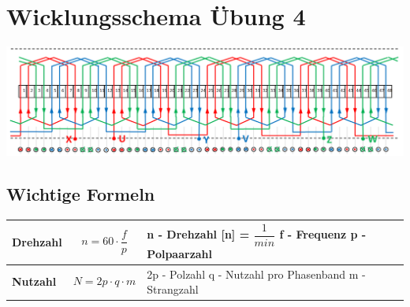 \section{Wicklungsschema Übung 4}
\includegraphics[scale = 0.5]{images/Wicklungsschema}
\subsection{Wichtige Formeln}
    \renewcommand{\arraystretch}{1}
\begin{tabular}{|C{0.3\textwidth}|P{0.3\textwidth}|P{0.3\textwidth}|}
	\hline
	\textbf{Drehzahl} &
    \[n = 60\cdot \dfrac{f}{p}\] &
    \vspace{0.1cm}n - Drehzahl [n] = $\dfrac{1}{min}$ \newline 
    f - Frequenz \newline
    p - Polpaarzahl 
    \\ \hline
	\textbf{Nutzahl} &
    \[ N = 2p\cdot q\cdot m\] &
    2p - Polzahl \newline 
    q - Nutzahl pro Phasenband \newline
    m - Strangzahl 
    \\ \hline						 
\end{tabular}

